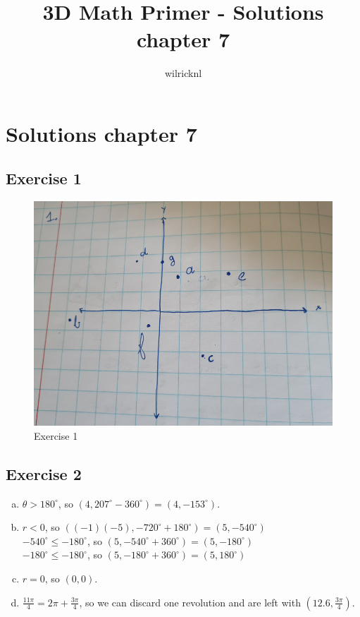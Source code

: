 \documentclass[11pt]{article}
\author{wilricknl}
\title{3D Math Primer - Solutions chapter 7}
\begin{document}
\maketitle

\section{Solutions chapter 7}


\subsection{Exercise 1}

\begin{figure}[H]
\centering
    \includegraphics{exercise01}
\caption{Exercise 1}
\label{fig:07-exercise-01}
\end{figure}


\subsection{Exercise 2}

\begin{enumerate}[a.]
	\item %
	$\theta > 180^\circ$, so $(4, 207^\circ - 360^\circ)= (4,-153^\circ)$.
	\item %
	$r < 0$, so $((-1)(-5),-720^\circ+180^\circ)=(5, -540^\circ)$\\
	$-540^\circ \leq -180^\circ$, so $(5, -540^\circ+360^\circ)=(5, -180^\circ)$ \\ 
	$-180^\circ \leq -180^\circ$, so $(5, -180^\circ+360^\circ)=(5, 180^\circ)$
	\item %
	$r = 0$, so $(0,0)$.
	\item %
	$\frac{11\pi}{4}=2\pi + \frac{3\pi}{4}$, so we can discard one revolution and are left with $(12.6, \frac{3\pi}{4})$.
\end{enumerate}
\end{document}
